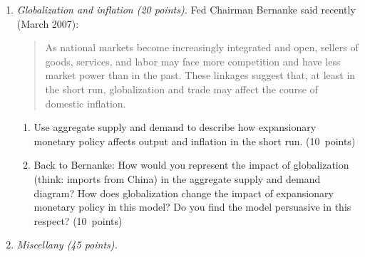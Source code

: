 \documentclass[letterpaper,12pt]{article}
\begin{document}
\begin{enumerate}
\begin{enumerate}
\end{enumerate}


\item {\it Globalization and inflation (20 points).\/}
Fed Chairman Bernanke said recently (March 2007):  
\begin{quote}
As national markets become increasingly integrated and open, sellers of goods, services, and labor may face more competition and have less market power than in the past. 
These linkages suggest that, at least in the short run, globalization and trade may affect the course of domestic inflation.
\end{quote}
%
\begin{enumerate}
\item Use aggregate supply and demand to 
describe how expansionary monetary policy 
affects output and inflation in the short run.  
(10~points)

\item Back to Bernanke:  How would you represent the impact of 
globalization (think:  imports from China) 
in the aggregate supply and demand diagram?  
How does globalization change the impact of expansionary monetary 
policy in this model?
Do you find the model persuasive in this respect?  
(10~points)
\end{enumerate}


\begin{comment}
Answer.
\begin{enumerate}
\item This would increase both output and prices (inflation, 
loosely speaking).  Your answer should show a diagram with 
AS, AD, and AS$^*$.
AD shifts out, with the stated result.  

\item The typical argument is that AS has become flatter.
As a result, expansionary monetary policy has a 
smaller impact on inflation, and larger impact on output. 

\end{enumerate}
\end{comment}


\item {\it Miscellany (45 points).}
%
\begin{enumerate} 


\end{enumerate}
\end{enumerate}
\end{document}
